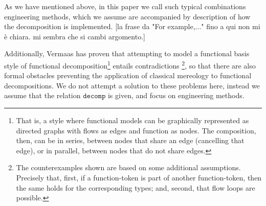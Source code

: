 \documentclass[sw]{iosart2x}
\newcommand{\generalStyle}[1]{\texttt{#1}}
\newcommand{\decom}{\generalStyle{decomp}}
\newcommand{\TODO}[1]{{\color{red} #1}}
\begin{document}
{\begin{itemize}
  As we have mentioned above, in this paper we call such typical combinations engineering methods, which we assume are accompanied by description of how the decomposition is implemented.\TODO{[la frase da "For example,..." fino a qui non mi è chiara. mi sembra che si cambi argomento.]}
\end{itemize}
Additionally, Vermaas has proven that attempting to model a functional basis style of functional decomposition\footnote{That is, a style where functional models can be graphically represented as directed graphs with flows as edges and function as nodes. The composition, then, can be in series, between nodes that share an edge (cancelling that edge), or in parallel, between nodes that do not share edges.} entails contradictions \cite{vermaasFormalImpossibilityAnalysing2013}\footnote{The counterexamples shown are based on some additional assumptions. Precisely that, first, if a function-token is part of another function-token, then the same holds for the corresponding types; and, second, that flow loops are possible. %
}, so that there are also formal obstacles preventing the application of classical mereology to functional decompositions.
We do not attempt a solution to these problems here,
instead we assume that the relation $\decom$ is given, and focus on engineering methods. %

}
\end{document}
